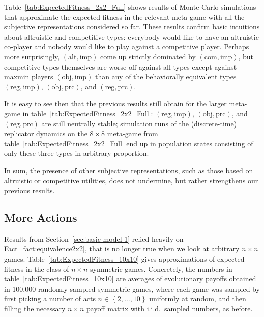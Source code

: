\documentclass[fleqn,reqno,12pt]{article}
\theoremstyle{Satz}
\theoremstyle{Bsp}
\newcommand{\set}[1]{\left\{#1\right\}}
\newcommand{\myalert}[1]{\textcolor{red}{#1}}
\begin{document}
Table~\ref{tab:ExpectedFitness_2x2_Full} shows results of Monte Carlo simulations that
approximate the expected fitness in the relevant meta-game with all the subjective representations considered so
far. These results confirm basic intuitions about altruistic and competitive types: everybody would like to have an altruistic co-player and nobody
would like to play against a competitive player. Perhaps more surprisingly, $(\text{alt}, \text{imp})$
come up strictly dominated by $(\text{com}, \text{imp})$, but competitive types themselves are worse off
against all types except against maxmin players $(\text{obj}, \text{imp})$ than any of
the behaviorally equivalent types $(\text{reg}, \text{imp})$, $(\text{obj}, \text{prc})$, and
$(\text{reg}, \text{prc})$.
\iffalse This is a noteworthy results in the light of the fact
that evolving altruistic preferences have been shown to support cooperative behavior in a
single stage game \myalert{[CITE]}. In contrast, averaging over payoffs in multiple stage
games, like we do here, makes altruistic preferences prime victims of evolutionary eradication.
\fi
It is easy to see then that the previous results still obtain for the larger meta-game in
table~\ref{tab:ExpectedFitness_2x2_Full}: $(\text{reg}, \text{imp})$,
$(\text{obj}, \text{prc})$, and $(\text{reg}, \text{prc})$ are still neutrally stable;
simulation runs of the (discrete-time) replicator dynamics on the $8 \times 8$ meta-game from
table~\ref{tab:ExpectedFitness_2x2_Full} end up in population states consisting of only these
three types in arbitrary proportion.

In sum, the presence of other subjective representations, such as those based on altruistic or competitive utilities, does not undermine, but rather strengthens our previous results.


                                   
\subsection{More Actions}
\label{sec:n-times-n}

Results from Section~\ref{sec:basic-model-1} relied heavily on Fact~\ref{fact:equivalence2x2}, that
is no longer true when we look at arbitrary $n \times n$ games. 
Table~\ref{tab:ExpectedFitness_10x10} gives approximations of expected fitness in the class of
$n \times n$ symmetric games. Concretely,
the numbers in table~\ref{tab:ExpectedFitness_10x10} are averages of evolutionary payoffs obtained in
100,000 randomly sampled symmetric games, where each game was sampled by first picking a number of acts
$n \in \set{2, \dots, 10}$ uniformly at random, and then filling the necessary $n \times n$
payoff matrix with i.i.d.~sampled numbers, as before.
\end{document}
